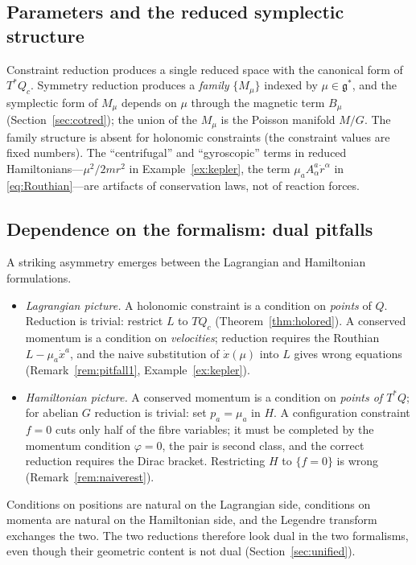 \documentclass[11pt,a4paper]{article}
\numberwithin{equation}{section}
\theoremstyle{plain}
\theoremstyle{definition}
\theoremstyle{remark}
\newcommand{\frakg}{\mathfrak{g}}
\begin{document}
\subsection{Parameters and the reduced symplectic structure}

Constraint reduction produces a single reduced space with the canonical form of $T^*Q_c$. Symmetry reduction produces a \emph{family} $\{M_\mu\}$ indexed by $\mu\in\frakg^*$, and the symplectic form of $M_\mu$ depends on $\mu$ through the magnetic term $B_\mu$ (Section~\ref{sec:cotred}); the union of the $M_\mu$ is the Poisson manifold $M/G$. The family structure is absent for holonomic constraints (the constraint values are fixed numbers). The ``centrifugal'' and ``gyroscopic'' terms in reduced Hamiltonians---$\mu^2/2mr^2$ in Example~\ref{ex:kepler}, the term $\mu_aA^a_\alpha\dot r^\alpha$ in \eqref{eq:Routhian}---are artifacts of conservation laws, not of reaction forces.

\subsection{Dependence on the formalism: dual pitfalls}

A striking asymmetry emerges between the Lagrangian and Hamiltonian formulations.

\begin{itemize}
\item \emph{Lagrangian picture.} A holonomic constraint is a condition on \emph{points} of $Q$. Reduction is trivial: restrict $L$ to $TQ_c$ (Theorem~\ref{thm:holored}). A conserved momentum is a condition on \emph{velocities}; reduction requires the Routhian $L-\mu_a\dot x^a$, and the naive substitution of $\dot x(\mu)$ into $L$ gives wrong equations (Remark~\ref{rem:pitfall1}, Example~\ref{ex:kepler}).
\item \emph{Hamiltonian picture.} A conserved momentum is a condition on \emph{points of $T^*Q$}; for abelian $G$ reduction is trivial: set $p_a=\mu_a$ in $H$. A configuration constraint $f=0$ cuts only half of the fibre variables; it must be completed by the momentum condition $\varphi=0$, the pair is second class, and the correct reduction requires the Dirac bracket. Restricting $H$ to $\{f=0\}$ is wrong (Remark~\ref{rem:naiverest}).
\end{itemize}
Conditions on positions are natural on the Lagrangian side, conditions on momenta are natural on the Hamiltonian side, and the Legendre transform exchanges the two. The two reductions therefore look dual in the two formalisms, even though their geometric content is not dual (Section~\ref{sec:unified}).
\end{document}
